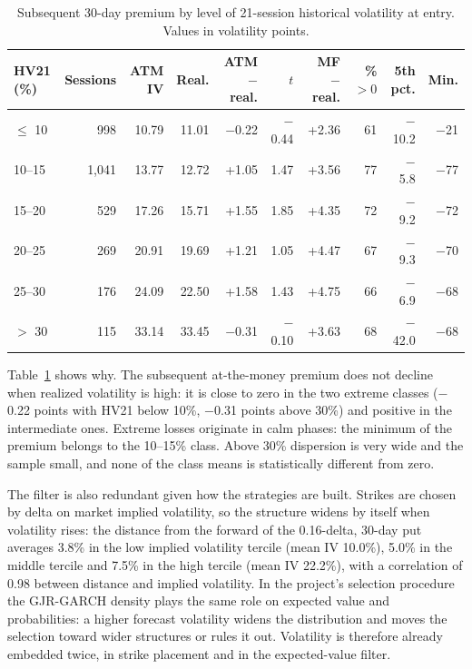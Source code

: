\documentclass[11pt,a4paper]{article}
\begin{document}
\begin{table}[ht]\centering\small
\caption{Subsequent 30-day premium by level of 21-session historical volatility at entry. Values in volatility points.}\label{tab:hv}
\begin{tabular}{lrrrrrrrrr}\toprule
HV21 (\%) & Sessions & ATM IV & Real. & ATM $-$ real. & $t$ & MF $-$ real. & \% $>0$ & 5th pct. & Min. \\ \midrule
$\le$ 10 & 998 & 10.79 & 11.01 & $-$0.22 & $-$0.44 & +2.36 & 61 & $-$10.2 & $-$21 \\
10--15 & 1,041 & 13.77 & 12.72 & +1.05 & 1.47 & +3.56 & 77 & $-$5.8 & $-$77 \\
15--20 & 529 & 17.26 & 15.71 & +1.55 & 1.85 & +4.35 & 72 & $-$9.2 & $-$72 \\
20--25 & 269 & 20.91 & 19.69 & +1.21 & 1.05 & +4.47 & 67 & $-$9.3 & $-$70 \\
25--30 & 176 & 24.09 & 22.50 & +1.58 & 1.43 & +4.75 & 66 & $-$6.9 & $-$68 \\
$>$ 30 & 115 & 33.14 & 33.45 & $-$0.31 & $-$0.10 & +3.63 & 68 & $-$42.0 & $-$68 \\
\bottomrule\end{tabular}\end{table}

Table~\ref{tab:hv} shows why. The subsequent at-the-money premium does not decline when realized volatility is high: it is close to zero in the two extreme classes ($-$0.22 points with HV21 below 10\%, $-$0.31 points above 30\%) and positive in the intermediate ones. Extreme losses originate in calm phases: the minimum of the premium belongs to the 10--15\% class. Above 30\% dispersion is very wide and the sample small, and none of the class means is statistically different from zero.

The filter is also redundant given how the strategies are built. Strikes are chosen by delta on market implied volatility, so the structure widens by itself when volatility rises: the distance from the forward of the 0.16-delta, 30-day put averages 3.8\% in the low implied volatility tercile (mean IV 10.0\%), 5.0\% in the middle tercile and 7.5\% in the high tercile (mean IV 22.2\%), with a correlation of 0.98 between distance and implied volatility. In the project's selection procedure the GJR-GARCH density plays the same role on expected value and probabilities: a higher forecast volatility widens the distribution and moves the selection toward wider structures or rules it out. Volatility is therefore already embedded twice, in strike placement and in the expected-value filter.
\end{document}
